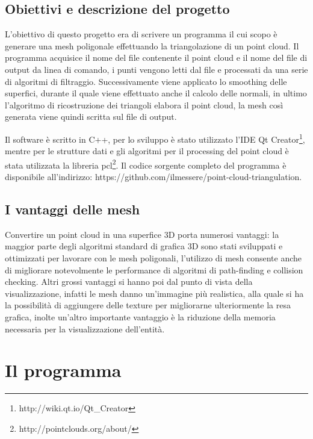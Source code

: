 \documentclass[a4paper,12pt]{article}
\begin{document}
	\subsection{Obiettivi e descrizione del progetto}
	L'obiettivo di questo progetto era di scrivere un programma il cui scopo è generare una mesh poligonale effettuando la
	triangolazione di un point cloud. 
  Il programma acquisice il nome del file contenente il point cloud e il nome del file di output da linea di comando,
	i punti vengono letti dal file e processati da una serie di algoritmi di filtraggio. 
	Successivamente viene applicato lo smoothing delle superfici, durante il quale viene effettuato anche il calcolo delle
	normali, in ultimo l'algoritmo di ricostruzione dei triangoli elabora il point cloud, la mesh così generata viene quindi
	scritta sul file di output.  
	
	Il software è scritto in C++, per lo sviluppo è stato utilizzato l'IDE Qt Creator\footnote{http://wiki.qt.io/Qt\_Creator},
	mentre per le strutture dati e gli algoritmi per il processing del point cloud è stata utilizzata la libreria
	pcl\footnote{http://pointclouds.org/about/}.	
	Il codice sorgente completo del programma è disponibile all'indirizzo: 
	https://github.com/ilmessere/point-cloud-triangulation.
	   	
	\subsection{I vantaggi delle mesh}
	Convertire un point cloud in una superfice 3D porta numerosi vantaggi: la maggior parte degli algoritmi standard di grafica
	3D sono stati sviluppati e ottimizzati per lavorare con le mesh poligonali, l'utilizzo di mesh consente anche di migliorare 
	notevolmente le performance di algoritmi di path-finding e collision checking. Altri grossi vantaggi si hanno poi dal punto
	di vista della visualizzazione, infatti le mesh danno un'immagine più realistica, alla quale si ha la possibilità di
	aggiungere delle texture per migliorarne ulteriormente la resa grafica, inolte un'altro importante vantaggio è la riduzione
	della memoria necessaria per la visualizzazione dell'entità. 
	
\clearpage
\section{Il programma}
\end{document}
